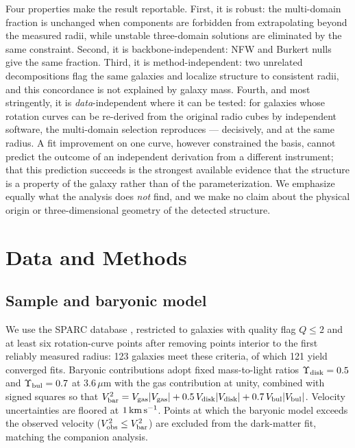 \documentclass[twocolumn]{aastex701}
\begin{document}
Four properties make the result reportable. First, it is robust: the
multi-domain fraction is unchanged when components are forbidden from
extrapolating beyond the measured radii, while unstable three-domain
solutions are eliminated by the same constraint. Second, it is
backbone-independent: NFW and Burkert nulls give the same fraction. Third, it
is method-independent: two unrelated decompositions flag the same galaxies and
localize structure to consistent radii, and this concordance is not explained
by galaxy mass. Fourth, and most stringently, it is \emph{data}-independent
where it can be tested: for galaxies whose rotation curves can be re-derived
from the original radio cubes by independent software, the multi-domain
selection reproduces --- decisively, and at the same radius. A fit improvement
on one curve, however constrained the basis, cannot predict the outcome of an
independent derivation from a different instrument; that this prediction
succeeds is the strongest available evidence that the structure is a property
of the galaxy rather than of the parameterization. We emphasize equally what
the analysis does \emph{not} find, and we make no claim about the physical
origin or three-dimensional geometry of the detected structure.

\section{Data and Methods} \label{sec:methods}

\subsection{Sample and baryonic model}

We use the SPARC database \citep{Lelli2016}, restricted to galaxies with
quality flag $Q \le 2$ and at least six rotation-curve points after removing
points interior to the first reliably measured radius: 123 galaxies meet
these criteria, of which 121 yield converged fits. Baryonic contributions
adopt fixed mass-to-light ratios $\Upsilon_{\rm disk} = 0.5$ and
$\Upsilon_{\rm bul} = 0.7$ at $3.6\,\mu$m with the gas contribution at unity,
combined with signed squares so that $V^2_{\rm bar} = V_{\rm gas}|V_{\rm
gas}| + 0.5\,V_{\rm disk}|V_{\rm disk}| + 0.7\,V_{\rm bul}|V_{\rm bul}|$.
Velocity uncertainties are floored at $1\,{\rm km\,s^{-1}}$. Points at which
the baryonic model exceeds the observed velocity ($V^2_{\rm obs} \le V^2_{\rm
bar}$) are excluded from the dark-matter fit, matching the companion analysis.
\end{document}

